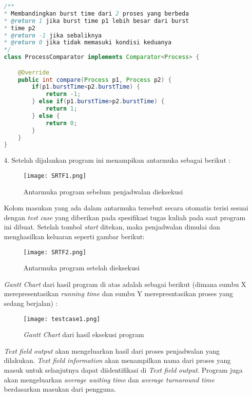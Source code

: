 \documentclass[a4paper,twoside]{article}
\begin{document}
\begin{enumerate}
\begin{lstlisting}[language=Java]
/**
* Membandingkan burst time dari 2 proses yang berbeda
* @return 1 jika burst time p1 lebih besar dari burst
* time p2
* @return -1 jika sebaliknya
* @return 0 jika tidak memasuki kondisi keduanya
*/
class ProcessComparator implements Comparator<Process> {

    @Override
    public int compare(Process p1, Process p2) {
        if(p1.burstTime<p2.burstTime) {
            return -1;
        } else if(p1.burstTime>p2.burstTime) {
            return 1;
        } else {
            return 0;
        }
    }
}
		\end{lstlisting}
		4. Setelah dijalankan program ini menampikan antarmuka sebagai berikut :
		\begin{center}
        \begin{figure}[!htbp]
            \centering
            \texttt{[image: SRTF1.png]}
            \caption{Antarmuka program sebelum penjadwalan dieksekusi}
            \label{}
        \end{figure}
		\end{center}
		
		Kolom masukan yang ada dalam antarmuka tersebut secara otomatis terisi sesuai dengan {\it test case} yang diberikan pada spesifikasi tugas kuliah pada saat program ini dibuat. Setelah tombol {\it start} ditekan, maka penjadwalan dimulai dan menghasilkan keluaran seperti gambar berikut:
		\begin{center}
        \begin{figure}[!htbp]
            \centering
            \texttt{[image: SRTF2.png]}
            \caption{Antarmuka program setelah dieksekusi}
            \label{}
        \end{figure}
		\end{center}
		{\it Gantt Chart} dari hasil program di atas adalah sebagai berikut (dimana sumbu X merepresentasikan {\it running time} dan sumbu Y merepresntasikan proses yang sedang berjalan) :
		\begin{center}
        \begin{figure}[!htbp]
            \centering
            \texttt{[image: testcase1.png]}
            \caption{{\it Gantt Chart} dari hasil eksekusi program}
            \label{}
        \end{figure}
		\end{center}
		{\it Text field output} akan mengeluarkan hasil dari proses penjadwalan yang dilakukan. {\it Text field information} akan menampilkan nama dari proses yang masuk untuk selanjutnya dapat diidentifikasi di {\it Text field output}. Program juga akan mengeluarkan {\it average waiting time} dan {\it average turnaround time} berdasarkan masukan dari pengguna.\newline \newline
		

\end{enumerate}
\end{document}
